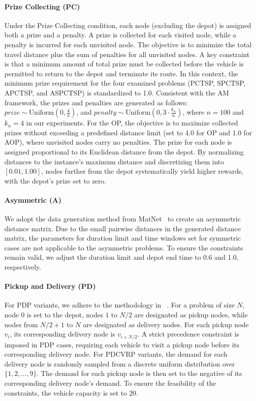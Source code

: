 \documentclass{article}
\theoremstyle{plain}
\theoremstyle{definition}
\theoremstyle{remark}
\begin{document}
\paragraph{Prize Collecting (PC)}
Under the Prize Collecting condition, each node (excluding the depot) is assigned both a prize and a penalty. A prize is collected for each visited node, while a penalty is incurred for each unvisited node. The objective is to minimize the total travel distance plus the sum of penalties for all unvisited nodes. A key constraint is that a minimum amount of total prize must be collected before the vehicle is permitted to return to the depot and terminate its route. In this context, the minimum prize requirement for the four examined problems (PCTSP, SPCTSP, APCTSP, and ASPCTSP) is standardized to 1.0. Consistent with the AM~\citep{kool2019attention} framework, the prizes and penalties are generated as follows: $prize \sim \text{Uniform}\left(0, \frac{4}{n}\right)$, and $penalty \sim \text{Uniform}\left(0, 3 \cdot \frac{k_n}{n}\right)$, where $n=100$ and $k_n=4$ in our experiments. For the OP, the objective is to maximize collected prizes without exceeding a predefined distance limit (set to 4.0 for OP and 1.0 for AOP), where unvisited nodes carry no penalties. The prize for each node is assigned proportional to its Euclidean distance from the depot. By normalizing distances to the instance's maximum distance and discretizing them into $[0.01, 1.00]$, nodes further from the depot systematically yield higher rewards, with the depot's prize set to zero.


\paragraph{Asymmetric (A)}
We adopt the data generation method from MatNet~\citep{kwon2021matnet} to create an asymmetric distance matrix. Due to the small pairwise distances in the generated distance matrix, the parameters for duration limit and time windows set for symmetric cases are not applicable to the asymmetric problems. To ensure the constraints remain valid, we adjust the duration limit and depot end time to 0.6 and 1.0, respectively.

\paragraph{Pickup and Delivery (PD)}
For PDP variants, we adhere to the methodology in ~\citet{li2021pdtsp}. For a problem of size $N$, node $0$ is set to the depot, nodes $1$ to $N/2$ are designated as pickup nodes, while nodes from $N/2+1$ to $N$ are designated as delivery nodes.  For each pickup node $v_i$, its corresponding delivery node is $v_{i+N/2}$. A strict precedence constraint is imposed in PDP cases, requiring each vehicle to visit a pickup node before its corresponding delivery node. For PDCVRP variants, the demand for each delivery node is randomly sampled from a discrete uniform distribution over $\{1,2,\ldots,9\}$. The demand for each pickup node is then set to the negative of its corresponding delivery node's demand. To ensure the feasibility of the constraints, the vehicle capacity is set to $20$. 
\end{document}
